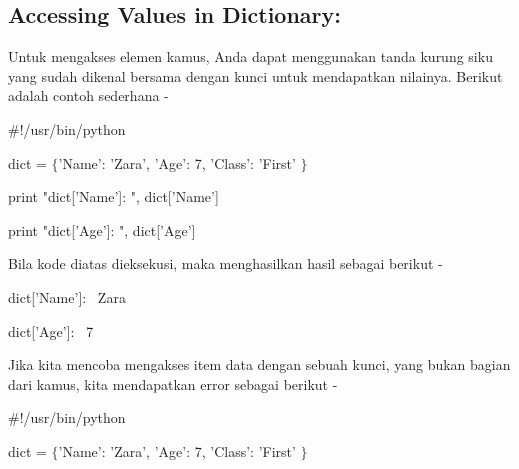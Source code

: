 \documentclass[a4paper,12pt]{report}
\begin{document}
\subsection*{Accessing Values in Dictionary:}
 \par
\begin{adjustwidth}{0.03in}{0.03in}
Untuk mengakses elemen kamus, Anda dapat menggunakan tanda kurung siku yang sudah dikenal bersama dengan kunci untuk mendapatkan nilainya. Berikut adalah contoh sederhana -\end{adjustwidth}
 \par
\noindent 
 \hspace*{0.5in}  $  \#  $!/usr/bin/python \par
\vspace{12pt}
\noindent 
 \hspace*{0.5in} dict =  $  \{  $'Name': 'Zara', 'Age': 7, 'Class': 'First' $  \}  $ \par
\vspace{12pt}
\noindent 
 \hspace*{0.5in} print "dict['Name']: ", dict['Name'] \par
\noindent 
 \hspace*{0.5in} print "dict['Age']: ", dict['Age'] \par
\begin{adjustwidth}{0.03in}{0.03in}
Bila kode diatas dieksekusi, maka menghasilkan hasil sebagai berikut -\end{adjustwidth}
 \par
\noindent 
{\fontsize{9pt}{9pt}\selectfont  \hspace*{0.5in} dict['Name']:~ Zara} \par
\noindent 
{\fontsize{9pt}{9pt}\selectfont  \hspace*{0.5in} dict['Age']:~ 7} \par
\begin{adjustwidth}{0.03in}{0.03in}
Jika kita mencoba mengakses item data dengan sebuah kunci, yang bukan bagian dari kamus, kita mendapatkan error sebagai berikut -\end{adjustwidth}
 \par
\noindent 
 \hspace*{0.5in}  $  \#  $!/usr/bin/python \par
\vspace{12pt}
\noindent 
 \hspace*{0.5in} dict =  $  \{  $'Name': 'Zara', 'Age': 7, 'Class': 'First' $  \}  $ \par
\vspace{12pt}
\end{document}
